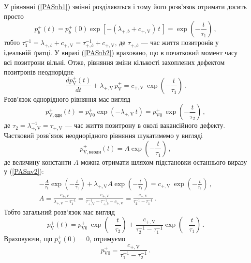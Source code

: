 У рівнянні (\ref{PASnb1}) змінні розділяються і тому його розв'язок отримати досить просто
\begin{equation}\label{PASnb2}
p_{b}^+(t)=p_{b}^+(0)\exp\left[-(\lambda_{+,b}+c_{+,\mathrm{V}})\,t\,\right]=\exp\left(-\frac{t}{\tau_1}\right)\,,
\end{equation}
тобто $\tau_1^{-1}=\lambda_{+,b}+c_{+,\mathrm{V}}=\tau_{+,b}^{-1}+c_{+,\mathrm{V}}$,
де $\tau_{+,b}$ --- час життя позитронів у ідеальній ґратці.
У виразі (\ref{PASnb2}) враховано, що в початковий момент часу всі позитрони вільні.
Отже, рівняння зміни кількості захоплених дефектом позитронів неоднорідне
\begin{equation}\label{PASnv2}
\frac{dp_{\mathrm{V}}^+(t)}{dt}+\lambda_{+,\mathrm{V}}\,p_{\mathrm{V}}^+=c_{+,\mathrm{V}}\:\exp\left(-\frac{t}{\tau_1}\right)\,.
\end{equation}
Розв'язок однорідного рівняння має вигляд
\begin{equation}
p_{\mathrm{V},\mbox{одн}}^+(t)=p_{\mathrm{V}0}^+\exp\left(-\lambda_{+,\mathrm{V}}\,t\right)
  =p_{\mathrm{V}0}^+\:\exp\left(-\frac{t}{\tau_2}\right)\,,
\end{equation}
де $\tau_2=\lambda_{+,\mathrm{V}}^{-1}=\tau_{+,\mathrm{V}}$ --- час життя позитрону в околі вакансійного дефекту.
Частковий розв'язок неоднорідного рівняння шукатимемо у вигляді
\begin{equation}
p_{\mathrm{V},\mbox{неодн}}^+(t)=A\exp\left(-\frac{t}{\tau_1}\right)\,,
\end{equation}
де величину константи $A$ можна отримати шляхом підстановки останнього виразу у (\ref{PASnv2}):
\begin{gather*}
-\frac{A}{\tau_1}\exp\left(-\frac{t}{\tau_1}\right)+\lambda_{+,\mathrm{V}}A\exp\left(-\frac{t}{\tau_1}\right)=c_{+,\mathrm{V}}\:\exp\left(-\frac{t}{\tau_1}\right)\,,\\
A=\frac{c_{+,\mathrm{V}}}{\lambda_{+,\mathrm{V}}-\tau_1^{-1}}= \frac{c_{+,\mathrm{V}}}{\tau_{+,\mathrm{V}}^{-1}-\tau_{+,b}^{-1}-c_{+,\mathrm{V}}}
=\frac{c_{+,\mathrm{V}}}{\tau_2^{-1}-\tau_1^{-1}}\,.
\end{gather*}
Тобто загальний розв'язок має вигляд
\begin{equation}\label{PASnb3}
p_{\mathrm{V}}^+(t)=p_{\mathrm{V}0}^+\:\exp\left(-\frac{t}{\tau_2}\right)+\frac{c_{+,\mathrm{V}}}{\tau_2^{-1}-\tau_1^{-1}}\exp\left(-\frac{t}{\tau_1}\right)\,.
\end{equation}
Враховуючи,
що $p_{\mathrm{V}}^+(0)=0$, отримуємо
\begin{equation}\label{PASnb4}
p_{\mathrm{V}0}^+=\frac{c_{+,\mathrm{V}}}{\tau_1^{-1}-\tau_2^{-1}}\,.
\end{equation}
